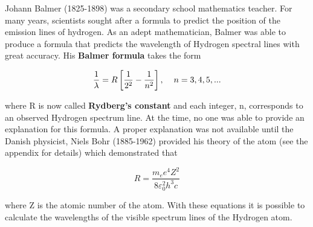 Johann Balmer (1825-1898) was a secondary school mathematics teacher. For many years, scientists sought after a formula to predict the position of the emission lines of hydrogen. As an adept mathematician, Balmer was able to produce a formula that predicts the wavelength of Hydrogen spectral lines with great accuracy. His {\bf Balmer formula} takes the form

\begin{equation}
\dfrac{1}{\lambda}=R\left[\dfrac{1}{2^2}-\dfrac{1}{n^2}\right],\hspace{4mm}n=3,4,5,...
\label{equ:sp2}
\end{equation}

\noindent where R is now called {\bf Rydberg's constant} and each integer, n, corresponds to an observed Hydrogen spectrum line. At the time, no one was able to provide an explanation for this formula. A proper explanation was not available until the Danish physicist, Niels Bohr (1885-1962) provided his theory of the atom (see the appendix for details) which demonstrated that

\begin{equation}
R=\dfrac{m_ee^4Z^2}{8\varepsilon^2_0h^3c}
\label{equ:sp3}
\end{equation}

\noindent where Z is the atomic number of the atom. With these equations it is possible to calculate the wavelengths of the visible spectrum lines of the Hydrogen atom.

